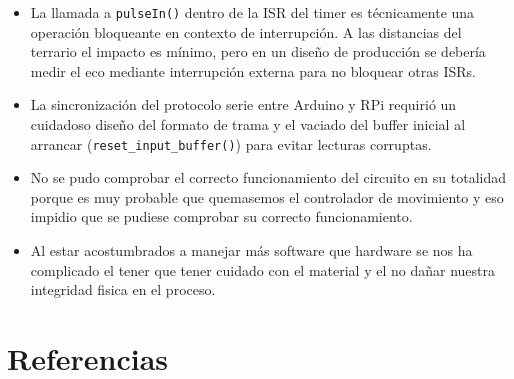 \documentclass[12pt, a4paper]{article}
\begin{document}
\begin{itemize}
      \item La llamada a \texttt{pulseIn()} dentro de la ISR del timer es técnicamente
          una operación bloqueante en contexto de interrupción. A las distancias
          del terrario el impacto es mínimo, pero en un diseño de producción se
          debería medir el eco mediante interrupción externa para no bloquear otras
          ISRs.

      \item La sincronización del protocolo serie entre Arduino y RPi requirió un
          cuidadoso diseño del formato de trama y el vaciado del buffer inicial al
          arrancar (\texttt{reset\_input\_buffer()}) para evitar lecturas corruptas.
      \item No se pudo comprobar el correcto funcionamiento del circuito en su totalidad porque es muy probable que quemasemos el controlador de movimiento y eso impidio que se pudiese comprobar su correcto funcionamiento.
      \item Al estar acostumbrados a manejar más software que hardware se nos ha complicado el tener que tener cuidado con el material y el no dañar nuestra integridad fisica en el proceso.
\end{itemize}



\newpage

\section{Referencias}
\end{document}
